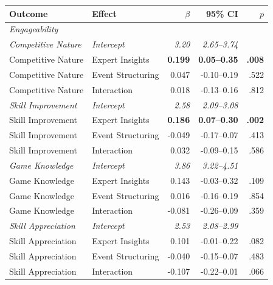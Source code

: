 \begin{table}[H]
\scriptsize
\centering
\begin{tabular}{l l r r r}
  \toprule
  Outcome & Effect & $\beta$ & 95\% CI & $p$ \\
  \midrule
  \multicolumn{5}{l}{\textit{Engageability}} \\
  \midrule
  \textit{Competitive Nature}  & \textit{Intercept}    & \textit{3.20}  & \textit{2.65--3.74}   & \\
  Competitive Nature    & Expert Insights   & \textbf{0.199} & \textbf{0.05--0.35} & \textbf{.008} \\
  Competitive Nature    & Event Structuring & 0.047          & -0.10--0.19           & .522 \\
  Competitive Nature    & Interaction       & 0.018          & -0.13--0.16           & .812 \\
  \addlinespace
  \textit{Skill Improvement}   & \textit{Intercept}    & \textit{2.58}  & \textit{2.09--3.08}   & \\
  Skill Improvement     & Expert Insights   & \textbf{0.186} & \textbf{0.07--0.30} & \textbf{.002} \\
  Skill Improvement     & Event Structuring & -0.049         & -0.17--0.07           & .413 \\
  Skill Improvement     & Interaction       & 0.032          & -0.09--0.15           & .586 \\
  \addlinespace
  \textit{Game Knowledge}      & \textit{Intercept}    & \textit{3.86}  & \textit{3.22--4.51}   & \\
  Game Knowledge        & Expert Insights   & 0.143          & -0.03--0.32           & .109 \\
  Game Knowledge        & Event Structuring & 0.016          & -0.16--0.19           & .854 \\
  Game Knowledge        & Interaction       & -0.081         & -0.26--0.09           & .359 \\
  \addlinespace
  \textit{Skill Appreciation}  & \textit{Intercept}    & \textit{2.53}  & \textit{2.08--2.99}   & \\
  Skill Appreciation    & Expert Insights   & 0.101          & -0.01--0.22           & .082 \\
  Skill Appreciation    & Event Structuring & -0.040         & -0.15--0.07           & .483 \\
  Skill Appreciation    & Interaction       & -0.107         & -0.22--0.01           & .066 \\

\end{tabular}
\end{table}
